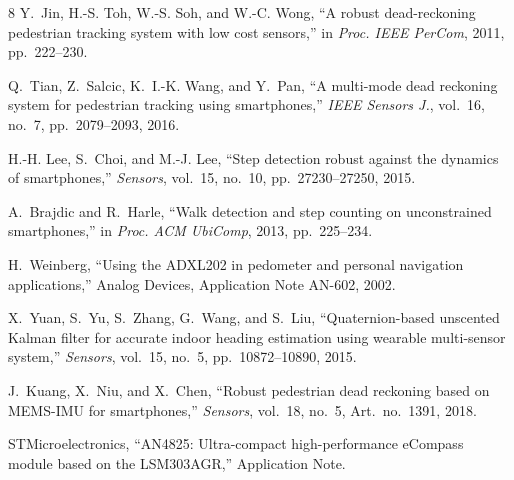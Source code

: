 \documentclass[conference,a4paper]{IEEEtran}
\begin{document}
\begin{thebibliography}{8}
Y.~Jin, H.-S. Toh, W.-S. Soh, and W.-C. Wong, ``A robust dead-reckoning pedestrian
tracking system with low cost sensors,'' in \emph{Proc. IEEE PerCom}, 2011, pp.~222--230.

Q.~Tian, Z.~Salcic, K.~I.-K. Wang, and Y.~Pan, ``A multi-mode dead reckoning system for
pedestrian tracking using smartphones,'' \emph{IEEE Sensors J.}, vol.~16, no.~7,
pp.~2079--2093, 2016.

H.-H. Lee, S.~Choi, and M.-J. Lee, ``Step detection robust against the dynamics of
smartphones,'' \emph{Sensors}, vol.~15, no.~10, pp.~27230--27250, 2015.

A.~Brajdic and R.~Harle, ``Walk detection and step counting on unconstrained
smartphones,'' in \emph{Proc. ACM UbiComp}, 2013, pp.~225--234.

H.~Weinberg, ``Using the ADXL202 in pedometer and personal navigation applications,''
Analog Devices, Application Note AN-602, 2002.

X.~Yuan, S.~Yu, S.~Zhang, G.~Wang, and S.~Liu, ``Quaternion-based unscented Kalman filter
for accurate indoor heading estimation using wearable multi-sensor system,''
\emph{Sensors}, vol.~15, no.~5, pp.~10872--10890, 2015.

J.~Kuang, X.~Niu, and X.~Chen, ``Robust pedestrian dead reckoning based on MEMS-IMU for
smartphones,'' \emph{Sensors}, vol.~18, no.~5, Art.~no.~1391, 2018.

STMicroelectronics, ``AN4825: Ultra-compact high-performance eCompass module based on the
LSM303AGR,'' Application Note.
\end{thebibliography}
\end{document}
